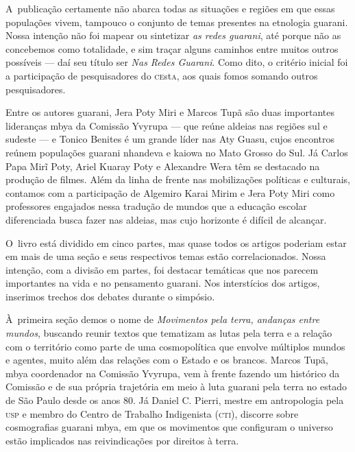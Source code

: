 A~publicação certamente não abarca todas as situações e regiões em que
essas populações vivem, tampouco o conjunto de temas presentes na
etnologia guarani. Nossa intenção não foi mapear ou sintetizar \emph{as redes
guarani}, até porque não as concebemos como totalidade, e sim traçar
alguns caminhos entre muitos outros possíveis --- daí seu título ser \emph{Nas
Redes Guarani}. Como dito, o critério inicial foi a participação de
pesquisadores do \textsc{ce}st\textsc{a}, aos quais fomos somando outros pesquisadores. 

Entre os autores guarani, Jera Poty Miri e Marcos Tupã são duas
importantes lideranças mbya da Comissão Yvyrupa --- que reúne aldeias nas
regiões sul e sudeste --- e Tonico Benites é um grande líder nas Aty
Guasu, cujos encontros reúnem populações guarani nhandeva e kaiowa no
Mato Grosso do Sul. Já Carlos Papa Mirĩ Poty, Ariel Kuaray Poty e
Alexandre Wera têm se destacado na produção de filmes. Além da linha de
frente nas mobilizações políticas e culturais, contamos com a
participação de Algemiro Karai Mirim e Jera Poty Miri como professores
engajados nessa tradução de mundos que a educação escolar diferenciada
busca fazer nas aldeias, mas cujo horizonte é difícil de alcançar.

O~livro está dividido em cinco partes, mas quase todos os artigos
poderiam estar em mais de uma seção e seus respectivos temas estão
correlacionados. Nossa intenção, com a divisão em partes, foi destacar
temáticas que nos parecem importantes na vida e no pensamento guarani.
Nos interstícios dos artigos, inserimos trechos dos debates durante o
simpósio.

À~primeira seção demos o nome de \emph{Movimentos pela terra, andanças entre
mundos}, buscando reunir textos que tematizam as lutas pela terra e a
relação com o território como parte de uma cosmopolítica que envolve
múltiplos mundos e agentes, muito além das relações com o Estado e os
brancos. Marcos Tupã, mbya coordenador na Comissão Yvyrupa, vem à
frente fazendo um histórico da Comissão e de sua própria trajetória em
meio à luta guarani pela terra no estado de São Paulo desde os anos 80.
Já Daniel C. Pierri, mestre em antropologia pela \textsc{usp} e membro do Centro
de Trabalho Indigenista (\textsc{cti}), discorre sobre cosmografias guarani
mbya, em que os movimentos que configuram o universo estão implicados
nas reivindicações por direitos à terra.

